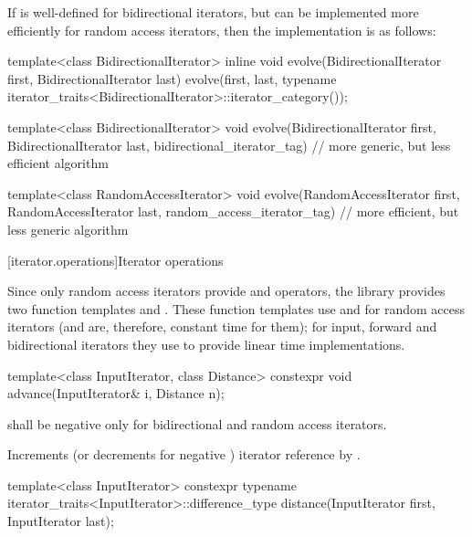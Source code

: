 \pnum
\begin{example}
If
is well-defined for bidirectional iterators, but can be implemented more
efficiently for random access iterators, then the implementation is as follows:

\begin{codeblock}
template<class BidirectionalIterator>
inline void
evolve(BidirectionalIterator first, BidirectionalIterator last) {
  evolve(first, last,
    typename iterator_traits<BidirectionalIterator>::iterator_category());
}

template<class BidirectionalIterator>
void evolve(BidirectionalIterator first, BidirectionalIterator last,
  bidirectional_iterator_tag) {
  // more generic, but less efficient algorithm
}

template<class RandomAccessIterator>
void evolve(RandomAccessIterator first, RandomAccessIterator last,
  random_access_iterator_tag) {
  // more efficient, but less generic algorithm
}
\end{codeblock}
\end{example}


[iterator.operations]{Iterator operations}

\pnum
Since only random access iterators provide
\tcode{+}
and
\tcode{-}
operators, the library provides two
function templates
and
.
These
function templates
use
\tcode{+}
and
\tcode{-}
for random access iterators (and are, therefore, constant
time for them); for input, forward and bidirectional iterators they use
\tcode{++}
to provide linear time
implementations.

%
\begin{itemdecl}
template<class InputIterator, class Distance>
  constexpr void advance(InputIterator& i, Distance n);
\end{itemdecl}

\begin{itemdescr}
\pnum
\requires
{}
shall be negative only for bidirectional and random access iterators.

\pnum
\effects
Increments (or decrements for negative
)
iterator reference
by
.
\end{itemdescr}

%
\begin{itemdecl}
template<class InputIterator>
  constexpr typename iterator_traits<InputIterator>::difference_type
    distance(InputIterator first, InputIterator last);
\end{itemdecl}

